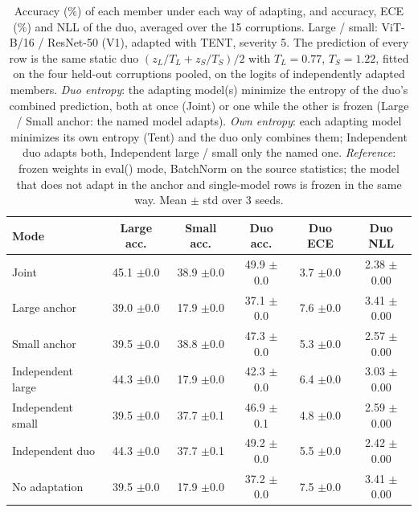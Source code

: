 \begin{table}[t]
    \centering
    \small
    \caption{Accuracy (\%) of each member under each way of adapting, and accuracy, ECE (\%) and NLL of the duo, averaged over the 15 corruptions. Large / small: ViT-B/16 / ResNet-50 (V1), adapted with TENT, severity 5. The prediction of every row is the same static duo $(z_L / T_L + z_S / T_S) / 2$ with $T_L = 0.77$, $T_S = 1.22$, fitted on the four held-out corruptions pooled, on the logits of independently adapted members. \emph{Duo entropy}: the adapting model(s) minimize the entropy of the duo's combined prediction, both at once (Joint) or one while the other is frozen (Large / Small anchor: the named model adapts). \emph{Own entropy}: each adapting model minimizes its own entropy (Tent) and the duo only combines them; Independent duo adapts both, Independent large / small only the named one. \emph{Reference}: frozen weights in eval() mode, BatchNorm on the source statistics; the model that does not adapt in the anchor and single-model rows is frozen in the same way. Mean $\pm$ std over 3 seeds.}
    \label{tab:adaptation_modes_summary:tent__vitb16_rn50v1}
    \begin{tabular}{lccccc}
        \toprule
        Mode & Large acc. & Small acc. & Duo acc. & Duo ECE & Duo NLL \\
        \midrule
        Joint & 45.1 {\scriptsize$\pm$0.0} & 38.9 {\scriptsize$\pm$0.0} & 49.9 {\scriptsize$\pm$0.0} & 3.7 {\scriptsize$\pm$0.0} & 2.38 {\scriptsize$\pm$0.00} \\
        Large anchor & 39.0 {\scriptsize$\pm$0.0} & 17.9 {\scriptsize$\pm$0.0} & 37.1 {\scriptsize$\pm$0.0} & 7.6 {\scriptsize$\pm$0.0} & 3.41 {\scriptsize$\pm$0.00} \\
        Small anchor & 39.5 {\scriptsize$\pm$0.0} & 38.8 {\scriptsize$\pm$0.0} & 47.3 {\scriptsize$\pm$0.0} & 5.3 {\scriptsize$\pm$0.0} & 2.57 {\scriptsize$\pm$0.00} \\
        \midrule
        Independent large & 44.3 {\scriptsize$\pm$0.0} & 17.9 {\scriptsize$\pm$0.0} & 42.3 {\scriptsize$\pm$0.0} & 6.4 {\scriptsize$\pm$0.0} & 3.03 {\scriptsize$\pm$0.00} \\
        Independent small & 39.5 {\scriptsize$\pm$0.0} & 37.7 {\scriptsize$\pm$0.1} & 46.9 {\scriptsize$\pm$0.1} & 4.8 {\scriptsize$\pm$0.0} & 2.59 {\scriptsize$\pm$0.00} \\
        Independent duo & 44.3 {\scriptsize$\pm$0.0} & 37.7 {\scriptsize$\pm$0.1} & 49.2 {\scriptsize$\pm$0.0} & 5.5 {\scriptsize$\pm$0.0} & 2.42 {\scriptsize$\pm$0.00} \\
        \midrule
        No adaptation & 39.5 {\scriptsize$\pm$0.0} & 17.9 {\scriptsize$\pm$0.0} & 37.2 {\scriptsize$\pm$0.0} & 7.5 {\scriptsize$\pm$0.0} & 3.41 {\scriptsize$\pm$0.00} \\
        \bottomrule
    \end{tabular}
\end{table}
